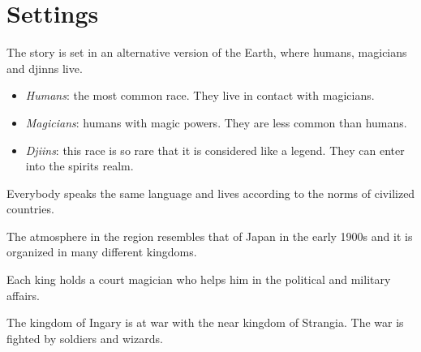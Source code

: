 \section{Settings}
The story is set in an alternative version of the Earth, where humans, magicians and djinns live.


\begin{itemize}
	\item \textit{Humans}: the most common race. They live in contact with magicians.

	\item \textit{Magicians}: humans with magic powers. They are less common than humans.

	\item \textit{Djiins}: this race is so rare that it is considered like a legend. They can enter into the spirits realm.
\end{itemize}

Everybody speaks the same language and lives according to the norms of civilized countries.

The atmosphere in the region resembles that of Japan in the early 1900s and it is organized in many different kingdoms.

Each king holds a court magician who helps him in the political and military affairs.


The kingdom of Ingary is at war with the near kingdom of Strangia. The war is fighted by soldiers and wizards.


